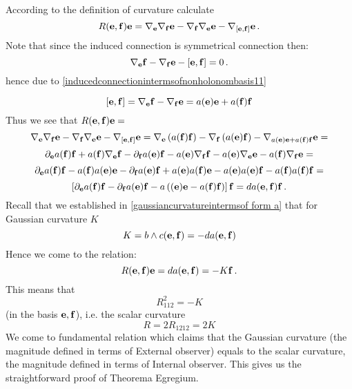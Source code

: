 \documentclass[12pt]{article}
\theoremstyle{theorem}
\numberwithin{equation}{section}
\begin{document}
 According to the definition of curvature calculate
         $$
 R({\bf e},{\bf f}){\bf e}=\nabla_{{\bf e}}\nabla_{{\bf f}}{\bf e}-\nabla_{{\bf f}}\nabla_{{\bf e}}{\bf e}-\nabla_{[{\bf e},{\bf f}]}{\bf e}\,.
         $$
Note that since the induced connection is symmetrical connection then:
        \begin{equation}\label{commutatorofnonholonombasis}
 \nabla_{\bf e} {\bf f}-\nabla_{\bf f} {\bf e}- [{\bf e},{\bf f}]=0\,.
\end{equation}
hence due to \eqref{inducedconnectionintermsofnonholonombasis11}

       \begin{equation}\label{commutatorofnonholonombasis}
 [{\bf e},{\bf f}]=\nabla_{\bf e} {\bf f}-\nabla_{\bf f} {\bf e}=a({\bf e}){\bf e}+a({\bf f}){\bf f}
\end{equation}
Thus we see that  $R({\bf e},{\bf f}){\bf e}=$
       $$
 \nabla_{{\bf e}}\nabla_{{\bf f}}{\bf e}-\nabla_{{\bf f}}\nabla_{{\bf e}}{\bf e}-\nabla_{[{\bf e},{\bf f}]}{\bf e}=
       \nabla_{\bf e}\left(a({\bf f}){\bf f}\right)-\nabla_{\bf f}\left(a({\bf e}){\bf f}\right)-\nabla_{a({\bf e}){\bf e}+a({\bf f}){\bf f}}{\bf e}=
       $$
       $$
  \partial_{{\bf e}}a({\bf f}){\bf f}+a({\bf f})\nabla_{\bf e}{\bf f}-\partial_{{\bf f}}a({\bf e}){\bf f}-a({\bf e})\nabla_{\bf f}{\bf f}-a({\bf e})\nabla_{\bf e}{\bf e}-a({\bf f})\nabla_{\bf f}{\bf e}=
       $$
       $$
  \partial_{{\bf e}}a({\bf f}){\bf f}-a({\bf f})a({\bf e}){\bf e}-\partial_{{\bf f}}a({\bf e}){\bf f}+a({\bf e})a({\bf f}){\bf e}-a({\bf e})a({\bf e}){\bf f}-a({\bf f})a({\bf f}){\bf f}=
       $$
       $$
       \left[\partial_{{\bf e}}a({\bf f}){\bf f}-\partial_{{\bf f}}a({\bf e}){\bf f}-a\left(({\bf e}){\bf e}-a({\bf f}){\bf f}\right)\right]{\bf f}=
       da({\bf e},{\bf f}){\bf f}\,.
       $$
  Recall that we established in \ref{gaussiancurvatureintermsof form a} that for Gaussian curvature $K$
          $$
       K=b\wedge c({\bf e},{\bf f})=-da({\bf e},{\bf f})
          $$
       Hence we come to the relation:
       \begin{equation}\label{relationbetweengausscurvatureand riemtensor}
        R({\bf e},{\bf f}){\bf e}=da({\bf e},{\bf f})=-K{\bf f}\,.
       \end{equation}
       This means that
       $$
         R^2_{112}=-K
       $$
(in the basis ${{\bf e},{\bf f}}$), i.e.
 the scalar curvature
   $$
R=2R_{1212}=2K
   $$
 We come to fundamental relation which claims that the Gaussian curvature  (the magnitude defined in terms of
 External observer) equals to the scalar curvature, the magnitude defined in terms of Internal observer.
   This gives us the straightforward proof of Theorema Egregium.
\end{document}
